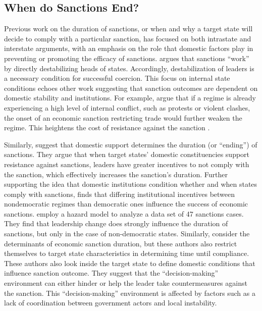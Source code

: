 \subsection*{When do Sanctions End?}
\label{lit}

Previous work on the duration of sanctions, or when and why a target state will decide to comply with a particular sanction, has focused on both intrastate and interstate arguments, with an emphasis on the role that domestic factors play in preventing or promoting the efficacy of sanctions. \cite{marinov2005} argues that sanctions ``work'' by directly destabilizing heads of states. Accordingly, destabilization of leaders is a necessary condition for successful coercion.  This focus on internal state conditions echoes other work suggesting that sanction outcomes are dependent on domestic stability and institutions. For example, {\cite{dashti1997}} argue that if a regime is already experiencing a high level of internal conflict, such as protests or violent clashes, the onset of an economic sanction restricting trade would further weaken the regime. This heightens the cost of resistance against the sanction \citep{dashti1997}. 

Similarly, \cite{dorussen2001} suggest that domestic support determines the duration (or ``ending'') of sanctions. They argue that when target states' domestic constituencies support resistance against sanctions, leaders have greater incentives to not comply with the sanction, which effectively increases the sanction's duration. Further supporting the idea that domestic institutions condition whether and when states comply with sanctions, \cite{lektzian2007} finds that differing institutional incentives between nondemocratic regimes than democratic ones influence the success of economic sanctions. \cite{mcgillivray2004} employ a hazard model to analyze a data set of 47 sanctions cases. They find that leadership change does strongly influence the duration of sanctions, but only in the case of non-democratic states. Similarly, \cite{bolks2000} consider the determinants of economic sanction duration, but these authors also restrict themselves to target state characteristics in determining time until compliance. These authors also look inside the target state to define domestic conditions that influence sanction outcome. They suggest that the ``decision-making'' environment can either hinder or help the leader take countermeasures against the sanction. This ``decision-making'' environment is affected by factors such as a lack of coordination between government actors and local instability. 

